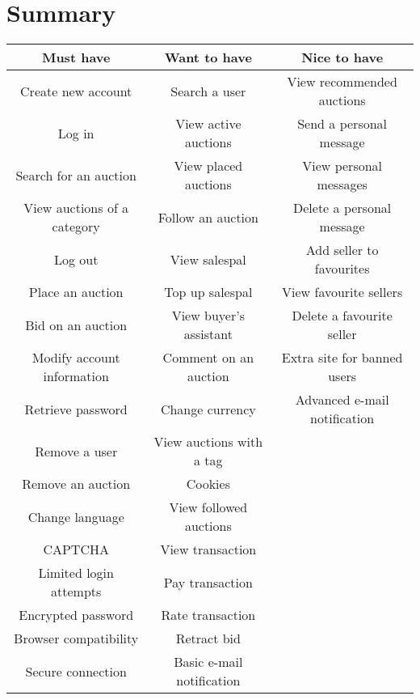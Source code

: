 \section{Summary}
	\begin{tabular}{|c|c|c|}	
		\hline \textbf{Must have} & \textbf{Want to have} & \textbf{Nice to have} \\ 
		\hline  Create new account & Search a user & View recommended auctions \\ 
		\hline  Log in & View active auctions & Send a personal message \\ 
		\hline  Search for an auction & View placed auctions & View personal messages \\
		\hline  View auctions of a category & Follow an auction & Delete a personal message \\ 
		\hline  Log out & View salespal & Add seller to favourites \\ 
		\hline  Place an auction & Top up salespal & View favourite sellers \\ 
		\hline  Bid on an auction & View buyer's assistant &  Delete a favourite seller\\ 
		\hline  Modify account information & Comment on an auction & Extra site for banned users \\ 
		\hline  Retrieve password & Change currency & Advanced e-mail notification \\ 
		\hline  Remove a user & View auctions with a tag &  \\ 
		\hline  Remove an auction & Cookies &  \\ 
		\hline  Change language & View followed auctions &  \\ 
		\hline  CAPTCHA & View transaction &  \\ 
		\hline  Limited login attempts & Pay transaction  &  \\ 
		\hline  Encrypted password & Rate transaction  &  \\
		\hline  Browser compatibility & Retract bid  &  \\
		\hline  Secure connection & Basic e-mail notification &  \\
		\hline
	\end{tabular} 